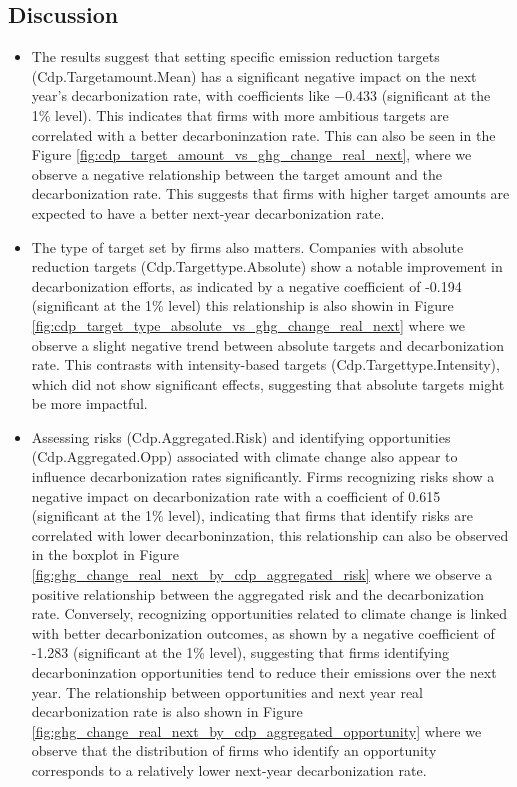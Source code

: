 \subsection{Discussion}
\begin{itemize}
\item The results suggest that setting specific emission reduction targets (Cdp.Targetamount.Mean) has a significant negative impact on the next year's decarbonization rate, with coefficients like $-0.433$ (significant at the 1\% level). This indicates that firms with more ambitious targets are correlated with a better decarboninzation rate. This can also be seen in the Figure \ref{fig:cdp_target_amount_vs_ghg_change_real_next}, where we observe a negative relationship between the target amount and the decarbonization rate. This suggests that firms with higher target amounts are expected to have a better next-year decarbonization rate. 
\item The type of target set by firms also matters. Companies with absolute reduction targets (Cdp.Targettype.Absolute) show a notable improvement in decarbonization efforts, as indicated by a negative coefficient of -0.194 (significant at the 1\% level) this relationship is also showin in Figure \ref{fig:cdp_target_type_absolute_vs_ghg_change_real_next} where we observe a slight negative trend between absolute targets and decarbonization rate. This contrasts with intensity-based targets (Cdp.Targettype.Intensity), which did not show significant effects, suggesting that absolute targets might be more impactful.

\item Assessing risks (Cdp.Aggregated.Risk) and identifying opportunities (Cdp.Aggregated.Opp) associated with climate change also appear to influence decarbonization rates significantly. Firms recognizing risks show a negative impact on decarbonization rate with a coefficient of 0.615 (significant at the 1\% level), indicating that firms that identify risks are correlated with lower decarboninzation, this relationship can also be observed in the boxplot in Figure \ref{fig:ghg_change_real_next_by_cdp_aggregated_risk} where we observe a positive relationship between the aggregated risk and the decarbonization rate. Conversely, recognizing opportunities related to climate change is linked with better decarbonization outcomes, as shown by a negative coefficient of -1.283 (significant at the 1\% level), suggesting that firms identifying decarboninzation opportunities tend to reduce their emissions over the next year. The relationship between opportunities and next year real decarbonization rate is also shown in Figure \ref{fig:ghg_change_real_next_by_cdp_aggregated_opportunity} where we observe that the distribution of firms who identify an opportunity corresponds to a relatively lower next-year decarbonization rate.


\end{itemize}
